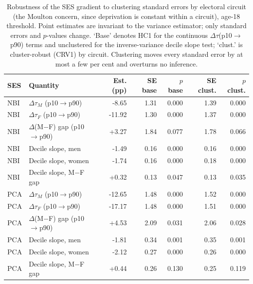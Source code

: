 \begin{table}[ht]
\centering
\caption{Robustness of the SES gradient to clustering standard errors by electoral circuit (the Moulton concern, since deprivation is constant within a circuit), age-18 threshold. Point estimates are invariant to the variance estimator; only standard errors and $p$-values change. `Base' denotes HC1 for the continuous $\Delta\tau$(p10$\to$p90) terms and unclustered for the inverse-variance decile slope test; `clust.' is cluster-robust (CRV1) by circuit. Clustering moves every standard error by at most a few per cent and overturns no inference.}
\label{tab:cluster_robustness}
\begin{tabular}{llrrrrr}
\toprule
SES & Quantity & Est. (pp) & SE base & $p$ base & SE clust. & $p$ clust. \\
\midrule
NBI & $\Delta\tau_M$ (p10$\to$p90) & -8.65 & 1.31 & 0.000 & 1.39 & 0.000 \\
NBI & $\Delta\tau_F$ (p10$\to$p90) & -11.92 & 1.30 & 0.000 & 1.37 & 0.000 \\
NBI & $\Delta$(M$-$F) gap (p10$\to$p90) & +3.27 & 1.84 & 0.077 & 1.78 & 0.066 \\
NBI & Decile slope, men & -1.49 & 0.16 & 0.000 & 0.16 & 0.000 \\
NBI & Decile slope, women & -1.74 & 0.16 & 0.000 & 0.18 & 0.000 \\
NBI & Decile slope, M$-$F gap & +0.32 & 0.13 & 0.047 & 0.13 & 0.035 \\
PCA & $\Delta\tau_M$ (p10$\to$p90) & -12.65 & 1.48 & 0.000 & 1.52 & 0.000 \\
PCA & $\Delta\tau_F$ (p10$\to$p90) & -17.17 & 1.48 & 0.000 & 1.51 & 0.000 \\
PCA & $\Delta$(M$-$F) gap (p10$\to$p90) & +4.53 & 2.09 & 0.031 & 2.06 & 0.028 \\
PCA & Decile slope, men & -1.81 & 0.34 & 0.001 & 0.35 & 0.001 \\
PCA & Decile slope, women & -2.12 & 0.27 & 0.000 & 0.26 & 0.000 \\
PCA & Decile slope, M$-$F gap & +0.44 & 0.26 & 0.130 & 0.25 & 0.119 \\
\bottomrule
\end{tabular}
\end{table}
